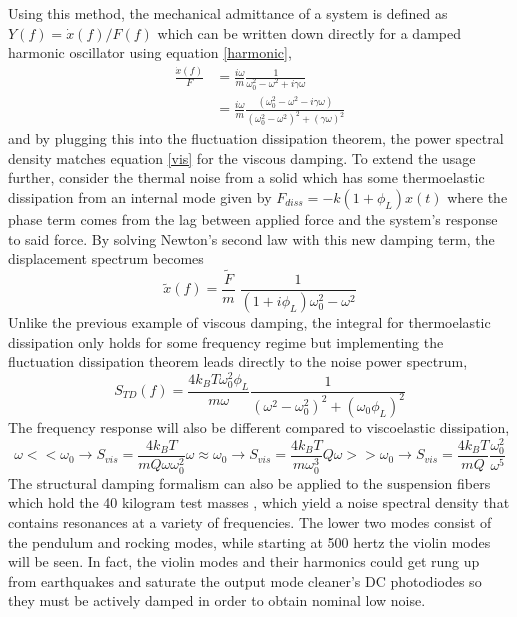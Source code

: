 		Using this method, the mechanical admittance of a system is defined as $Y(f) = \dot{x}(f)/F(f)$ which can be written down directly for a damped harmonic oscillator using equation \ref{harmonic},
		\begin{equation}
			\begin{aligned}
			\frac{\dot{x}(f)}{F} &= \frac{i \omega}{m} \frac{1}{\omega_{0}^2 - \omega^2 +i\gamma \omega}\\
								 &= \frac{i\omega}{m} \frac{(\omega_{0}^2 - \omega^2 - i \gamma \omega)}{(\omega_0^2 - \omega^2)^2 + (\gamma \omega)^2}
			\end{aligned}
		\end{equation}
		and by plugging this into the fluctuation dissipation theorem, the power spectral density matches equation \ref{vis} for the viscous damping.  To extend the usage further, consider the thermal noise from a solid which has some thermoelastic dissipation from an internal mode given by $F_{diss} = -k(1+\phi_L) x(t) $ where the phase term comes from the lag between applied force and the system's response to said force.  By solving Newton's second law with this new damping term, the displacement spectrum becomes 
		\begin{equation}
		\tilde{x}(f) =  \frac{\tilde{F}}{m} \; \frac{1}{(1 + i\phi_L ) \omega_{0}^2 - \omega^2 }
		\end{equation}
		Unlike the previous example of viscous damping, the integral for thermoelastic dissipation only holds for some frequency regime but implementing the fluctuation dissipation theorem leads directly to the noise power spectrum,
		\begin{equation}
			S_{TD}(f) =  \frac{4k_B T \omega_{0}^2 \phi_L}{m \omega} \frac{1}{(\omega^2 - \omega_{0}^2)^2 + (\omega_{0}\phi_L)^2}
		\end{equation}
		The frequency response will also be different compared to viscoelastic dissipation,
		\begin{subequations}
			\begin{equation}
			\omega<< \omega_{0} \rightarrow S_{vis} = \frac{4k_B T}{m Q \omega \omega_{0}^2}
			\end{equation}
			\begin{equation}
			\omega \approx \omega_{0} \rightarrow S_{vis} = \frac{4k_B T}{m \omega_{0}^3} Q
			\end{equation}
			\begin{equation}
			\omega >> \omega_{0} \rightarrow S_{vis} = \frac{4k_B T}{m Q} \frac{\omega_0^2}{\omega^5} 
			\end{equation}
		\end{subequations}
		The structural damping formalism can also be applied to the suspension fibers which hold the 40 kilogram test masses \cite{SaulsonThermalSus}, \cite{Saulson} which yield a noise spectral density that contains resonances at a variety of frequencies.  The lower two modes consist of the pendulum and rocking modes, while starting at 500 hertz the violin modes will be seen.  In fact, the violin modes and their harmonics could get rung up from earthquakes and saturate the output mode cleaner's DC photodiodes so they must be actively damped in order to obtain nominal low noise.
		
